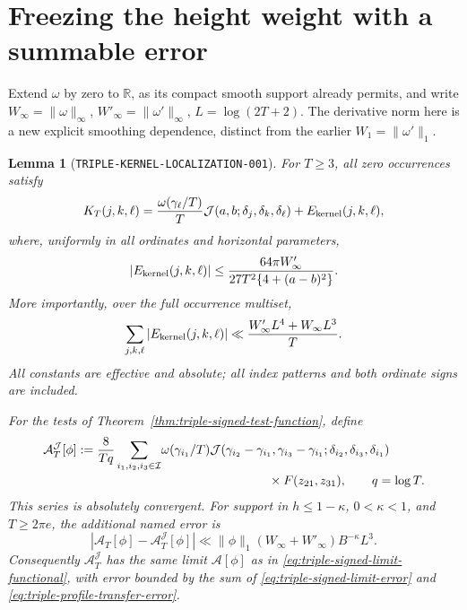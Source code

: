 \documentclass[11pt]{article}
\newtheorem{lemma}{Lemma}
\begin{document}
\section{Freezing the height weight with a summable error}

Extend \(\omega\) by zero to \(\mathbb R\), as its compact smooth support
already permits, and write
\(W_\infty=\|\omega\|_\infty\),
\(W'_{\infty}=\|\omega'\|_\infty\), \(L=\log(2T+2)\).
The derivative norm here is a new explicit smoothing dependence,
distinct from the earlier \(W_1=\|\omega'\|_1\).

\begin{lemma}[\texttt{TRIPLE-KERNEL-LOCALIZATION-001}]
\label{lem:triple-kernel-localization}
For \(T\geq3\), all zero occurrences satisfy
\begin{equation}\label{eq:triple-kernel-freeze}
 K_T(j,k,\ell)=\frac{\omega(\gamma_\ell/T)}T
       \mathcal J(a,b;\delta_j,\delta_k,\delta_\ell)
       +E_{\rm kernel}(j,k,\ell),
\end{equation}
where, uniformly in all ordinates and horizontal parameters,
\begin{equation}\label{eq:triple-kernel-point-error}
 |E_{\rm kernel}(j,k,\ell)|
 \leq\frac{64\pi W'_{\infty}}
               {27T^2\{4+(a-b)^2\}}.
\end{equation}
More importantly, over the full occurrence multiset,
\begin{equation}\label{eq:triple-kernel-sum-error}
 \sum_{j,k,\ell}|E_{\rm kernel}(j,k,\ell)|
 \ll\frac{W'_{\infty}L^4+W_\infty L^3}{T}.
\end{equation}
All constants are effective and absolute; all index patterns and both
ordinate signs are included.

For the tests of Theorem~\ref{thm:triple-signed-test-function}, define
\begin{align}
 \mathcal A_T^{\mathcal J}[\phi]
 :=\frac8{Tq}\sum_{i_1,i_2,i_3\in\mathcal I}
 &\omega(\gamma_{i_1}/T)
 \mathcal J(\gamma_{i_2}-\gamma_{i_1},\gamma_{i_3}-\gamma_{i_1};
                   \delta_{i_2},\delta_{i_3},\delta_{i_1})\notag\\[-2pt]
 &\hspace{30mm}{}\times F(z_{21},z_{31}),\qquad q=\log T.
 \label{eq:triple-profile-statistic}
\end{align}
This series is absolutely convergent. For support in \(h\leq1-\kappa\),
\(0<\kappa<1\), and \(T\geq2\pi e\), the additional named error is
\begin{equation}\label{eq:triple-profile-transfer-error}
 |\mathcal A_T[\phi]-\mathcal A_T^{\mathcal J}[\phi]|
 \ll\|\phi\|_1(W_\infty+W'_{\infty})B^{-\kappa}L^3.
\end{equation}
Consequently \(\mathcal A_T^{\mathcal J}\) has the same limit
\(\mathcal A[\phi]\) as in \eqref{eq:triple-signed-limit-functional},
with error bounded by the sum of
\eqref{eq:triple-signed-limit-error} and
\eqref{eq:triple-profile-transfer-error}.
\end{lemma}
\end{document}
